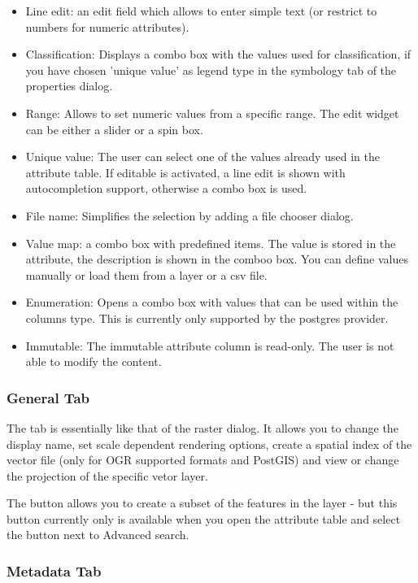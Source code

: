 \begin{itemize}
\item Line edit: an edit field which allows to enter simple text (or restrict
to
numbers for numeric attributes).
\item Classification: Displays a combo box with the values used for
classification, if you have chosen 'unique value' as legend type in the
symbology tab of the properties dialog.
\item Range: Allows to set numeric values from a specific range. The edit
widget can be either a slider or a spin box.
\item Unique value: The user can select one of the values already used in the
attribute table. If editable is activated, a line edit is shown with
autocompletion support, otherwise a combo box is used.
\item File name: Simplifies the selection by adding a file chooser dialog.
\item Value map: a combo box with predefined items. The value is stored in
the attribute, the description is shown in the comboo box. You can define
values manually or load them from a layer or a csv file.
\item Enumeration: Opens a combo box with values that can be used within the
columns type. This is currently only supported by the postgres provider.
\item Immutable: The immutable attribute column is read-only. The user is not
able to modify the content.
\end{itemize}

\subsubsection{General Tab}\label{vectorgeneraltab}

The  tab is essentially like that of the raster dialog. It
allows you to change the display name, set scale dependent rendering options,
create a spatial index of the vector file (only for OGR supported formats and
PostGIS) and view or change the projection of the specific vetor layer.

The  button allows you to create a subset of the
features in the layer - but this button currently only is available when you
open the attribute table and select the  button next to Advanced
search.

\subsubsection{Metadata Tab}

